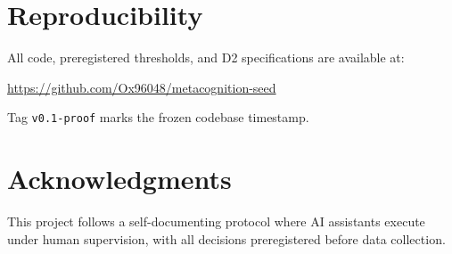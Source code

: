 \documentclass{article}
\begin{document}
\section{Reproducibility}

All code, preregistered thresholds, and D2 specifications are available at:
\begin{center}
\url{https://github.com/Ox96048/metacognition-seed}
\end{center}
Tag \texttt{v0.1-proof} marks the frozen codebase timestamp.

\section*{Acknowledgments}

This project follows a self-documenting protocol where AI assistants execute under human supervision, with all decisions preregistered before data collection.
\end{document}
